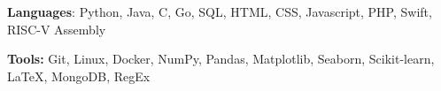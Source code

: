\documentclass{article}
\begin{document}
    


    \begin{adjustwidth}{1em}{1em}
        
        \textbf{Languages}: Python, Java, C, Go, SQL, HTML, CSS, Javascript, PHP, Swift, RISC-V Assembly
    
        \vspace{1mm}

        \textbf{Tools:} Git, Linux, Docker, NumPy, Pandas, Matplotlib, Seaborn, Scikit-learn, \LaTeX, MongoDB, RegEx

    \end{adjustwidth}

    
\end{document}

